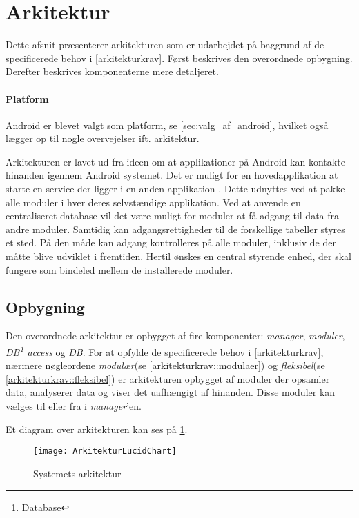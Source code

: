 \section{Arkitektur}\label{sec:arkitektur}
Dette afsnit præsenterer arkitekturen som er udarbejdet på baggrund af de specificerede behov i \cref{arkitekturkrav}.
Først beskrives den overordnede opbygning.
Derefter beskrives komponenterne mere detaljeret.

\paragraph{Platform}
Android er blevet valgt som platform, se \cref{sec:valg_af_android}, hvilket også lægger op til nogle overvejelser ift. arkitektur.

Arkitekturen er lavet ud fra ideen om at applikationer på Android kan kontakte hinanden igennem Android systemet.
Det er muligt for en hovedapplikation at starte en service der ligger i en anden applikation \citep{android_service}.
Dette udnyttes ved at pakke alle moduler i hver deres selvstændige applikation.
Ved at anvende en centraliseret database vil det være muligt for moduler at få adgang til data fra andre moduler.
Samtidig kan adgangsrettigheder til de forskellige tabeller styres et sted.
På den måde kan adgang kontrolleres på alle moduler, inklusiv de der måtte blive udviklet i fremtiden.
Hertil ønskes en central styrende enhed, der skal fungere som bindeled mellem de installerede moduler.

\subsection{Opbygning}\label{arkitektur:opbygning}
Den overordnede arkitektur er opbygget af fire komponenter: \textit{manager}, \textit{moduler}, \textit{DB\footnote{Database} access} og \textit{DB}.
For at opfylde de specificerede behov i \cref{arkitekturkrav}, nærmere nøgleordene \textit{modulær}(se \cref{arkitekturkrav::modulaer}) og \textit{fleksibel}(se \cref{arkitekturkrav::fleksibel}) er arkitekturen opbygget af moduler der opsamler data, analyserer data og viser det uafhængigt af hinanden.
Disse moduler kan vælges til eller fra i \textit{manager}'en.


Et diagram over arkitekturen kan ses på \cref{arkitektur_udkast_1}.
\begin{figure}[h]
	\centering						%
	\texttt{[image: ArkitekturLucidChart]}
	\caption{Systemets arkitektur}
  \label{arkitektur_udkast_1}
\end{figure}

